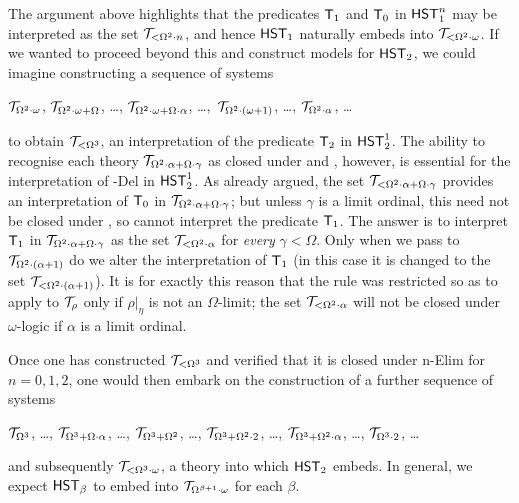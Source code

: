 \documentclass[UKenglish,cleveref,DIV=12]{scrartcl}
\theoremstyle{definition}
\theoremstyle{definition}
\begin{document}
The argument above highlights that the predicates $\mathsf{T}_1$ and $\mathsf{T}_0$ in $\mathsf{HST}_1^n$ may be
interpreted as the set $\mathcal{T}_{<\Omega^2\cdot n}$, and hence $\mathsf{HST}_1$ naturally
embeds into $\mathcal{T}_{<\Omega^2\cdot\omega}$. If we wanted to proceed beyond this
and construct models for $\mathsf{HST}_2$, we could imagine constructing a sequence of
systems
\begin{center}
  $\mathcal{T}_{\Omega^2\cdot\omega}$, $\mathcal{T}_{\Omega^2\cdot\omega+\Omega}$, \dots,
  $\mathcal{T}_{\Omega^2\cdot\omega+\Omega\cdot \alpha}$, \dots,\,
  $\mathcal{T}_{\Omega^2\cdot(\omega+1)}$, \dots,
  $\mathcal{T}_{\Omega^2\cdot\alpha}$, \dots%
\end{center}
to obtain $\mathcal{T}_{<\Omega^3}$,
an interpretation of the predicate $\mathsf{T}_2$ in $\mathsf{HST}_2^1$. The ability to recognise
each theory $\mathcal{T}_{\Omega^2\cdot\alpha+\Omega\cdot \gamma}$ as closed under  and
, however, is essential for the interpretation of -Del in
$\mathsf{HST}_2^1$. As already argued, the set $\mathcal{T}_{<\Omega^2\cdot\alpha+\Omega\cdot \gamma}$
provides an interpretation of $\mathsf{T}_0$ in $\mathcal{T}_{\Omega^2\cdot\alpha+\Omega\cdot \gamma}$; but
unless $\gamma$ is a limit ordinal, this need not be closed under , so cannot
interpret the predicate $\mathsf{T}_1$. The answer is to interpret $\mathsf{T}_1$ in
$\mathcal{T}_{\Omega^2\cdot\alpha+\Omega\cdot \gamma}$ as the set
$\mathcal{T}_{<\Omega^2\cdot\alpha}$ for \emph{every} $\gamma<\Omega$. Only when we
pass to $\mathcal{T}_{\Omega^2\cdot(\alpha+1)}$ do we alter the
interpretation of $\mathsf{T}_1$ (in this case it is changed to the set
$\mathcal{T}_{<\Omega^2\cdot(\alpha+1)}$). It is for exactly this reason that the rule
\Uni\eta was restricted so as to apply to $\mathcal{T}_\rho$ only if
$\rho|_\eta$ is not an $\Omega$-limit; the set $\mathcal{T}_{<\Omega^2\cdot\alpha}$ will
not be closed under $\omega$-logic if $\alpha$ is a limit ordinal.

Once one has constructed $\mathcal{T}_{<\Omega^3}$ and verified that it is closed
under \textT n-Elim for $n=0,1,2$, one would then embark on the construction of
a further sequence of systems
\begin{center}
$\mathcal{T}_{\Omega^3}$,  \dots, %
$\mathcal{T}_{\Omega^3+\Omega\cdot \alpha}$, \dots, %
$\mathcal{T}_{\Omega^3+\Omega^2}$, \dots, $\mathcal{T}_{\Omega^3+\Omega^2\cdot2}$, \dots,
$\mathcal{T}_{\Omega^3+\Omega^2\cdot\alpha}$, \dots, $\mathcal{T}_{\Omega^3\cdot2}$, \dots
\end{center}
and subsequently $\mathcal{T}_{<\Omega^3\cdot\omega}$, a theory into which $\mathsf{HST}_2$ embeds.
%
In general, we expect $\mathsf{HST}_\beta$ to embed into $\mathcal{T}_{\Omega^{\beta+1}\cdot\omega}$ for each $\beta$.
\end{document}
